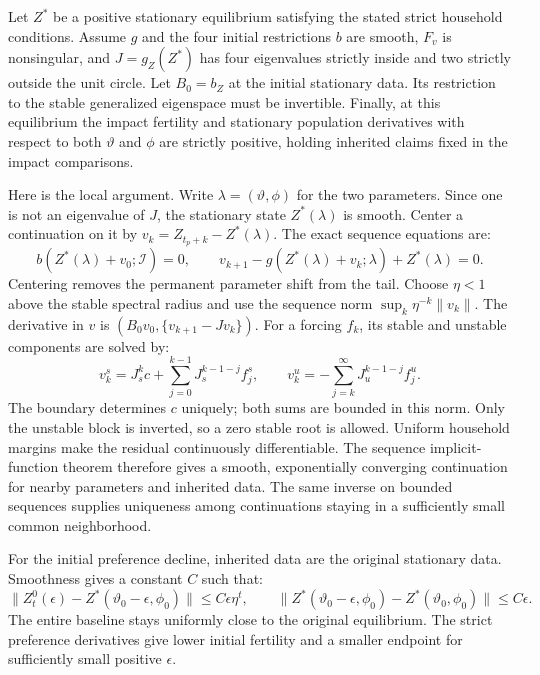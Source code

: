 \documentclass[11pt]{article}
\begin{document}
Let $Z^*$ be a positive stationary equilibrium satisfying the stated strict
household conditions. Assume $g$ and the four initial restrictions $b$
are smooth, $F_v$ is nonsingular, and $J=g_Z(Z^*)$ has four eigenvalues
strictly inside and two strictly outside the unit circle. Let $B_0=b_Z$
at the initial stationary data. Its restriction to the stable generalized
eigenspace must be invertible. Finally, at this equilibrium the impact
fertility and stationary population derivatives with respect to both
$\vartheta$ and $\phi$ are strictly positive, holding inherited claims fixed
in the impact comparisons.

Here is the local argument. Write $\lambda=(\vartheta,\phi)$ for the two
parameters. Since one is not an eigenvalue of $J$, the stationary state
$Z^*(\lambda)$ is smooth. Center a continuation on it by
$v_k=Z_{t_p+k}-Z^*(\lambda)$. The exact sequence equations are:
\begin{equation}
 b(Z^*(\lambda)+v_0;\mathcal I)=0,\qquad
 v_{k+1}-g(Z^*(\lambda)+v_k;\lambda)+Z^*(\lambda)=0.
 \label{eq:amend_sequence_equations}
\end{equation}
Centering removes the permanent parameter shift from the tail.
Choose $\eta<1$ above the stable spectral radius and use the sequence norm
$\sup_k\eta^{-k}\|v_k\|$. The derivative in $v$ is
$(B_0v_0,\{v_{k+1}-Jv_k\})$. For a forcing $f_k$, its stable and
unstable components are solved by:
\begin{equation}
 v_k^s=J_s^kc+\sum_{j=0}^{k-1}J_s^{k-1-j}f_j^s,
 \qquad
 v_k^u=-\sum_{j=k}^{\infty}J_u^{k-1-j}f_j^u.
 \label{eq:amend_sequence_inverse}
\end{equation}
The boundary determines $c$ uniquely; both sums are bounded in this norm.
Only the unstable block is inverted, so a zero stable root is allowed.
Uniform household margins make the residual continuously differentiable.
The sequence implicit-function theorem therefore gives a smooth,
exponentially converging continuation for nearby parameters and inherited
data. The same inverse on bounded sequences supplies uniqueness among
continuations staying in a sufficiently small common neighborhood.

For the initial preference decline, inherited data are the original
stationary data. Smoothness gives a constant $C$ such that:
\begin{equation}
 \|Z_t^0(\epsilon)-Z^*(\vartheta_0-\epsilon,\phi_0)\|
 \leq C\epsilon\eta^t,\qquad
 \|Z^*(\vartheta_0-\epsilon,\phi_0)-Z^*(\vartheta_0,\phi_0)\|
 \leq C\epsilon.
 \label{eq:amend_uniform_baseline}
\end{equation}
The entire baseline stays uniformly close to the original equilibrium.
The strict preference derivatives give lower initial fertility and a smaller
endpoint for sufficiently small positive $\epsilon$.
\end{document}
